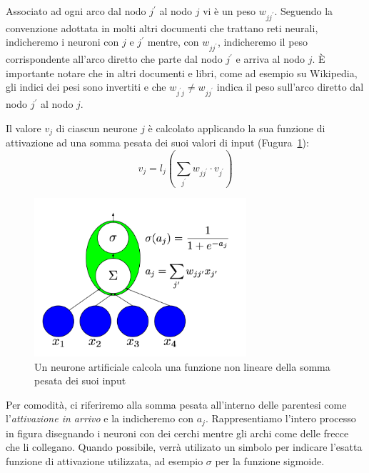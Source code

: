 Associato ad ogni arco dal nodo $j^{'}$ al nodo $j$ vi \`e un peso $w_{jj^{'}}$. Seguendo la convenzione adottata in molti altri documenti che trattano reti neurali, indicheremo i neuroni con $j$ e $j^{'}$ mentre, con $w_{jj^{'}}$, indicheremo il peso corrispondente all'arco diretto che parte dal nodo $j^{'}$ e arriva al nodo $j$.
\`E importante notare che in altri documenti e libri, come ad esempio su Wikipedia, gli indici dei pesi sono invertiti e che $w_{j^{'}j} \neq w_{jj^{'}}$ indica il peso sull'arco diretto dal nodo $j^{'}$ al nodo $j$.

Il valore $v_j$ di ciascun neurone $j$ \`e calcolato applicando la sua funzione di attivazione ad una somma pesata dei suoi valori di input (Fugura~\ref{fig:artificialNeuron}): %
\begin{equation} %
  v_j = l_j\left( \sum_{j^{'}} w_{jj^{'}} \cdot v_{j^{'}} \right)
\end{equation}

\begin{figure}[tp]
  \centering
  \begin{center}
    \includegraphics[width=0.7\textwidth]{./images/artificialNeuron.png}
  \end{center}
  \caption{Un neurone artificiale calcola una funzione non lineare della somma pesata dei suoi input}
  \label{fig:artificialNeuron}
\end{figure}
Per comodit\`a, ci riferiremo alla somma pesata all'interno delle parentesi come l'\emph{attivazione in arrivo} e la indicheremo con $a_j$. Rappresentiamo l'intero processo in figura disegnando i neuroni con dei cerchi mentre gli archi come delle frecce che li collegano.
Quando possibile, verr\`a utilizato un simbolo per indicare l'esatta funzione di attivazione utilizzata, ad esempio $\sigma$ per la funzione sigmoide.

